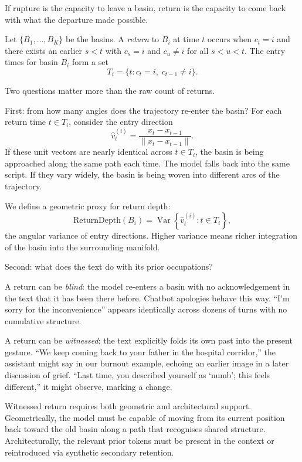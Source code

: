 \documentclass[12pt,a4paper]{article}
\begin{document}
If rupture is the capacity to leave a basin, return is the capacity to come back with what the departure made possible.

Let $\{B_1, \ldots, B_K\}$ be the basins. A \emph{return} to $B_i$ at time $t$ occurs when $c_t = i$ and there exists an earlier $s < t$ with $c_s = i$ and $c_u \neq i$ for all $s < u < t$. The entry times for basin $B_i$ form a set
\[
T_i = \{ t : c_t = i,\; c_{t-1} \neq i \}.
\]

Two questions matter more than the raw count of returns.

First: from how many angles does the trajectory re-enter the basin? For each return time $t \in T_i$, consider the entry direction
\[
\hat{v}_t^{(i)} = \frac{x_t - x_{t-1}}{\|x_t - x_{t-1}\|}.
\]
If these unit vectors are nearly identical across $t \in T_i$, the basin is being approached along the same path each time. The model falls back into the same script. If they vary widely, the basin is being woven into different arcs of the trajectory.

We define a geometric proxy for return depth:
\begin{equation}
\text{ReturnDepth}(B_i) = \operatorname{Var}\left\{\hat{v}^{(i)}_t : t \in T_i\right\},
\end{equation}
the angular variance of entry directions. Higher variance means richer integration of the basin into the surrounding manifold.

Second: what does the text do with its prior occupations?

A return can be \emph{blind}: the model re-enters a basin with no acknowledgement in the text that it has been there before. Chatbot apologies behave this way. ``I'm sorry for the inconvenience'' appears identically across dozens of turns with no cumulative structure.

A return can be \emph{witnessed}: the text explicitly folds its own past into the present gesture. ``We keep coming back to your father in the hospital corridor,'' the assistant might say in our burnout example, echoing an earlier image in a later discussion of grief. ``Last time, you described yourself as `numb'; this feels different,'' it might observe, marking a change.

Witnessed return requires both geometric and architectural support. Geometrically, the model must be capable of moving from its current position back toward the old basin along a path that recognises shared structure. Architecturally, the relevant prior tokens must be present in the context or reintroduced via synthetic secondary retention.
\end{document}
